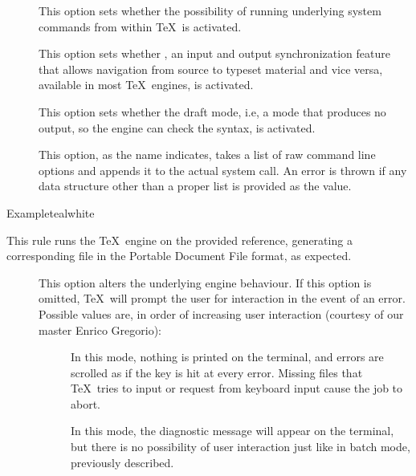 \begin{description}
\begin{description}
\item[] This option sets whether the possibility of running underlying system commands from within \TeX\ is activated.

\item[] This option sets whether , an input and output synchronization feature that allows navigation from source to typeset material and vice versa, available in most \TeX\ engines, is activated.

\item[] This option sets whether the draft mode, i.e, a mode that produces no output, so the engine can check the syntax, is activated.

\item[] This option, as the name indicates, takes a list of raw command line options and appends it to the actual system call. An error is thrown if any data structure other than a proper list is provided as the value.
\end{description}

\begin{codebox}{Example}{teal}{\icnote}{white}
\end{codebox}

\item[\rulebox{luatex}]
This rule runs the  \TeX\ engine on the provided  reference, generating a corresponding file in the Portable Document File format, as expected.

\begin{description}
\item[] This option alters the underlying engine behaviour. If this option is omitted, \TeX\ will prompt the user for interaction in the event of an error. Possible values are, in order of increasing user interaction (courtesy of our master Enrico Gregorio):

\begin{description}
\item[] In this mode, nothing is printed on the terminal, and errors are scrolled as if the  key is hit at every error. Missing files that \TeX\ tries to input or request from keyboard input cause the job to abort.

\item[] In this mode, the diagnostic message will appear on the terminal, but there is no possibility of user interaction just like in batch mode, previously described.


\end{description}
\end{description}
\end{description}
